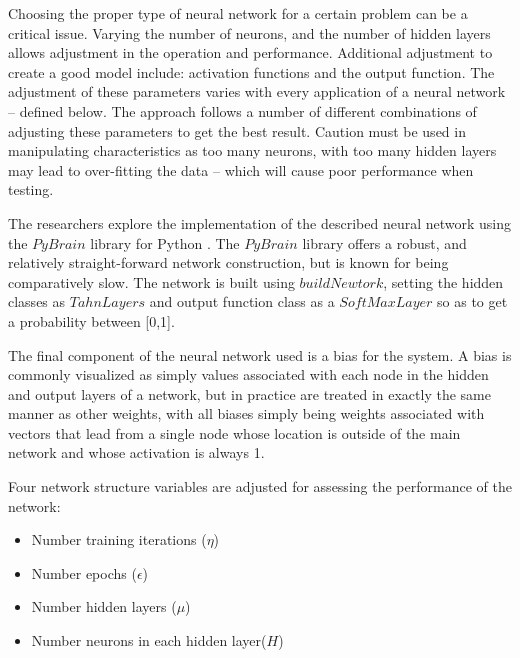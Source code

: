 \documentclass[conference]{IEEEtran}
\begin{document}
{Choosing the proper type of neural network for a certain problem can be a critical issue.
Varying the number of neurons, and the number of hidden layers allows adjustment in the operation and performance.
Additional adjustment to create a good model include: activation functions and the output function\cite{moustafa}. 
The adjustment of these parameters varies with every application of a neural network -- defined below.
The approach follows a number of different combinations of adjusting these parameters to get the best result.
Caution must be used in manipulating characteristics as too many neurons, with too many hidden layers may lead to over-fitting the data -- which will cause poor performance when testing.

The researchers explore the implementation of the described neural network using the $PyBrain$ library for Python \cite{PyBrain}.
The $PyBrain$ library offers a robust, and relatively straight-forward network construction, but is known for being comparatively slow.
The network is built using $buildNewtork$, setting the hidden classes as $TahnLayers$ and output function class as a $SoftMaxLayer$ so as to get a probability between [0,1].

The final component of the neural network used is a bias for the system.
A bias is commonly visualized as simply values associated with each node in the hidden and output layers of a network, but in practice are treated in exactly the same manner as other weights, with all biases simply being weights associated with vectors that lead from a single node whose location is outside of the main network and whose activation is always 1.

Four network structure variables are adjusted for assessing the performance of the network:
\begin{itemize}
\item Number training iterations ($\eta$)
\item Number epochs ($\epsilon$)
\item Number hidden layers ($\mu$)
\item Number neurons in each hidden layer($H$)
\end{itemize}

}
\end{document}
